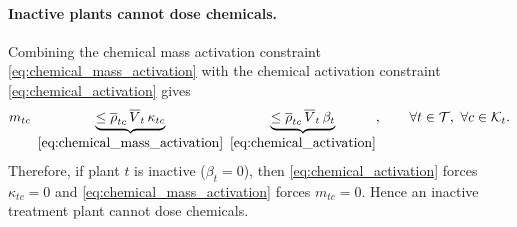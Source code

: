 \documentclass[10pt]{article}
\begin{document}
\paragraph{Inactive plants cannot dose chemicals.}
Combining the chemical mass activation constraint \eqref{eq:chemical_mass_activation} with the chemical activation constraint \eqref{eq:chemical_activation} gives
\begin{equation}\label{eq:implicit_chemical_plant_activation}
    m_{tc}
    ~\underbrace{\le
    \overline{\rho}_{tc}\,\overline{V}_t\,\kappa_{tc}}_{\eqref{eq:chemical_mass_activation}}
    ~\underbrace{\le
    \overline{\rho}_{tc}\,\overline{V}_t\,\beta_t}_{\eqref{eq:chemical_activation}},
    \qquad
    \forall t \in \mathcal{T},\ \forall c \in \mathcal{K}_t.
\end{equation}
Therefore, if plant $t$ is inactive ($\beta_t=0$), then \eqref{eq:chemical_activation} forces $\kappa_{tc}=0$ and \eqref{eq:chemical_mass_activation} forces $m_{tc}=0$.
Hence an inactive treatment plant cannot dose chemicals.
\end{document}
